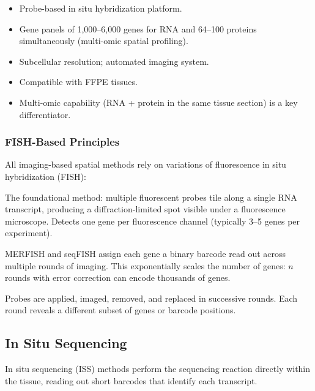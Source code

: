 \begin{itemize}[nosep]
  \item Probe-based in situ hybridization platform.
  \item Gene panels of 1,000--6,000 genes for RNA and 64--100 proteins
    simultaneously (multi-omic spatial profiling).
  \item Subcellular resolution; automated imaging system.
  \item Compatible with FFPE tissues.
  \item Multi-omic capability (RNA + protein in the same tissue section) is a
    key differentiator.
\end{itemize}

\subsubsection{FISH-Based Principles}

All imaging-based spatial methods rely on variations of fluorescence in situ
hybridization (FISH):

\begin{description}[style=nextline]
  \item[Single-molecule FISH (smFISH)] The foundational method: multiple
    fluorescent probes tile along a single RNA transcript, producing a
    diffraction-limited spot visible under a fluorescence microscope. Detects
    one gene per fluorescence channel (typically 3--5 genes per experiment).
  \item[Combinatorial barcoding] MERFISH and seqFISH assign each gene a
    binary barcode read out across multiple rounds of imaging. This
    exponentially scales the number of genes: $n$ rounds with error correction
    can encode thousands of genes.
  \item[Sequential hybridization] Probes are applied, imaged, removed, and
    replaced in successive rounds. Each round reveals a different subset of
    genes or barcode positions.
\end{description}


\subsection{In Situ Sequencing}
\label{sec:spatial:insitu}

In situ sequencing (ISS) methods perform the sequencing reaction directly
within the tissue, reading out short barcodes that identify each transcript.

